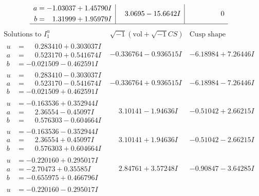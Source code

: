 \documentclass[1p]{elsarticle_modified}
\theoremstyle{definition}
\newcommand{\I}{\sqrt{-1}}
\begin{document}
$$\begin{array}{c|c|c}
\begin{aligned}
a &= -1.03037 + 1.45790 I \\
b &= \phantom{-}1.31999 + 1.95979 I\end{aligned}
 & \phantom{-}3.0695 - 15.6642 I & \phantom{-0.000000 } 0\\
 \hline 
 \end{array}$$\newpage$$\begin{array}{c|c|c}  
\text{Solutions to }I^u_{1}& \I (\text{vol} + \sqrt{-1}CS) & \text{Cusp shape}\\
 \hline 
\begin{aligned}
u &= \phantom{-}0.283410 + 0.303037 I \\
a &= \phantom{-}0.523170 + 0.541674 I \\
b &= -0.021509 - 0.462591 I\end{aligned}
 & -0.336764 - 0.936515 I & -6.18984 + 7.26446 I \\ \hline\begin{aligned}
u &= \phantom{-}0.283410 - 0.303037 I \\
a &= \phantom{-}0.523170 - 0.541674 I \\
b &= -0.021509 + 0.462591 I\end{aligned}
 & -0.336764 + 0.936515 I & -6.18984 - 7.26446 I \\ \hline\begin{aligned}
u &= -0.163536 + 0.352944 I \\
a &= \phantom{-}2.36554 - 0.45097 I \\
b &= \phantom{-}0.576303 - 0.604664 I\end{aligned}
 & \phantom{-}3.10141 - 1.94636 I & -0.51042 + 2.66215 I \\ \hline\begin{aligned}
u &= -0.163536 - 0.352944 I \\
a &= \phantom{-}2.36554 + 0.45097 I \\
b &= \phantom{-}0.576303 + 0.604664 I\end{aligned}
 & \phantom{-}3.10141 + 1.94636 I & -0.51042 - 2.66215 I \\ \hline\begin{aligned}
u &= -0.220160 + 0.295017 I \\
a &= -2.70473 + 0.35585 I \\
b &= -0.655975 + 0.466796 I\end{aligned}
 & \phantom{-}2.84761 + 3.57248 I & -0.90847 - 3.64285 I \\ \hline\begin{aligned}
u &= -0.220160 - 0.295017 I \\

\end{aligned}
\end{array}$$
\end{document}

